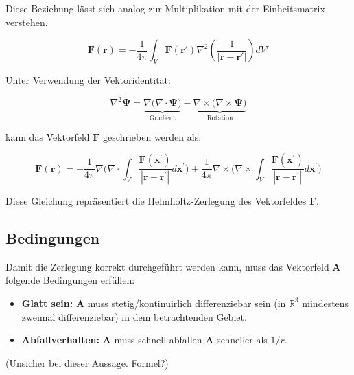 Diese Beziehung lässt sich analog zur Multiplikation mit der Einheitsmatrix verstehen.



\begin{equation}
\mathbf{F}(\mathbf{r}) = -\frac{1}{4\pi} \int_V \mathbf{F}(\mathbf{r}') \nabla^2 \left( \frac{1}{|\mathbf{r} - \mathbf{r}'|} \right) dV'
\end{equation}

Unter Verwendung der Vektoridentität:

\begin{equation}
\nabla^2 \mathbf{\Psi}= \underbrace{\nabla \Big( \nabla \cdot \mathbf{\Psi} \Big)}_{\text{Gradient}} -\underbrace{\nabla \times \Big(\nabla \times \mathbf{\Psi} \Big)}_{\text{Rotation}}
\end{equation}

kann das Vektorfeld $\mathbf{F}$ geschrieben werden als:

\begin{equation}
\mathbf{F}(\mathbf{r}) = - \frac{1}{4 \pi} \nabla \bigg( \nabla \cdot \int_V \frac{\mathbf{F}(\mathbf{x}^{\prime})}{|\mathbf{r} - \mathbf{r}^{\prime}|} d\mathbf{x}^{\prime} \bigg) + \frac{1}{4 \pi} \nabla \times \bigg( \nabla \times \int_V \frac{\mathbf{F}(\mathbf{x}^{\prime})}{|\mathbf{r} - \mathbf{r}^{\prime}|} d\mathbf{x}^{\prime} \bigg)
\end{equation}

Diese Gleichung repräsentiert die Helmholtz-Zerlegung des Vektorfeldes $\mathbf{F}$.

\subsection{Bedingungen
\label{helmholtz:subsection:Bedingung}}

Damit die Zerlegung korrekt durchgeführt werden kann, muss das Vektorfeld $\mathbf{A}$ folgende Bedingungen erfüllen:

\begin{itemize}
\item \textbf{Glatt sein:} $\mathbf{A}$ muss stetig/kontinuirlich differenziebar sein (in $\mathbb{R}^3$ mindestens zweimal differenziebar) in dem betrachtenden Gebiet.
\item \textbf{Abfallverhalten:} $\mathbf{A}$ muss schnell abfallen  $\mathbf{A}$ schneller als $1/r$. 
\end{itemize}
(Unsicher bei dieser Aussage. Formel?)


